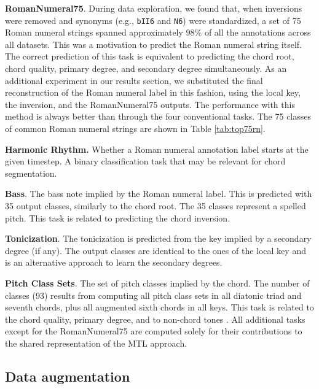 \documentclass{article}
\begin{document}
\textbf{RomanNumeral75}. During data exploration, we found that, when inversions were removed and synonyms (e.g., \texttt{bII6} and \texttt{N6}) were standardized, a set of 75 Roman numeral strings spanned approximately $98\%$ of all the annotations across all datasets. This was a motivation to predict the Roman numeral string itself. The correct prediction of this task is equivalent to predicting the chord root, chord quality, primary degree, and secondary degree simultaneously. As an additional experiment in our results section, we substituted the final reconstruction of the Roman numeral label in this fashion, using the local key, the inversion, and the RomanNumeral75 outputs. The performance with this method is always better than through the four conventional tasks. The 75 classes of common Roman numeral strings are shown in Table \ref{tab:top75rn}. 


\textbf{Harmonic Rhythm.} Whether a Roman numeral annotation label starts at the given timestep. A binary classification task that may be relevant for chord segmentation.

\textbf{Bass}. The bass note implied by the Roman numeral label. This is predicted with 35 output classes, similarly to the chord root. The 35 classes represent a spelled pitch. This task is related to predicting the chord inversion.

\textbf{Tonicization}. The tonicization is predicted from the key implied by a secondary degree (if any). 
The output classes are identical to the ones of the local key and is an alternative approach to learn the secondary degrees.

\textbf{Pitch Class Sets}. The set of pitch classes implied by the chord. The number of classes (93) results from computing all pitch class sets in all diatonic triad and seventh chords, plus all augmented sixth chords in all keys. This task is related to the chord quality, primary degree, and to non-chord tones \cite{ju_non-chord_2017}.
All additional tasks except for the RomanNumeral75 are computed solely for their contributions to the shared representation of the MTL approach.

\subsection{Data augmentation}
\end{document}
